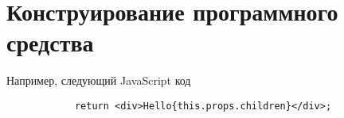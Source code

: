 \section{Конструирование программного средства} 
\label{sec:development}

Например, следующий JavaScript код 
\begin{lstlisting}
			return <div>Hello{this.props.children}</div>;
\end{lstlisting}
